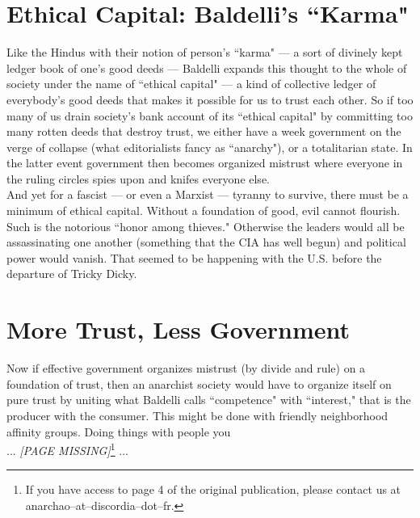 \section*{Ethical Capital: Baldelli's ``Karma"}
Like the Hindus with their notion of person's ``karma" --- a sort of divinely kept ledger book of one's good deeds --- Baldelli expands this thought to the whole of society under the name of ``ethical capital" --- a kind of collective ledger of everybody's good deeds that makes it possible for us to trust each other. So if too many of us drain society's bank account of its ``ethical capital" by committing too many rotten deeds that destroy trust, we either have a week government on the verge of collapse (what editorialists fancy as ``anarchy"), or a totalitarian state. In the latter event government then becomes organized mistrust where everyone in the ruling circles spies upon and knifes everyone else.\\
And yet for a fascist --- or even a Marxist --- tyranny to survive, there must be a minimum of ethical capital. Without a foundation of good, evil cannot flourish. Such is the notorious ``honor among thieves." Otherwise the leaders would all be assassinating one another (something that the CIA has well begun) and political power would vanish. That seemed to be happening with the U.S. before the departure of Tricky Dicky.

\section*{More Trust, Less Government}
Now if effective government organizes mistrust (by divide and rule) on a foundation of trust, then an anarchist society would have to organize itself on pure trust by uniting what Baldelli calls ``competence" with ``interest," that is the producer with the consumer. This might be done with friendly neighborhood affinity groups. Doing things with people you\\

\noindent ... \emph{[PAGE MISSING]}\footnote{If you have access to page 4 of the original publication, please contact us at anarchao--at--discordia--dot--fr.} ...\\

